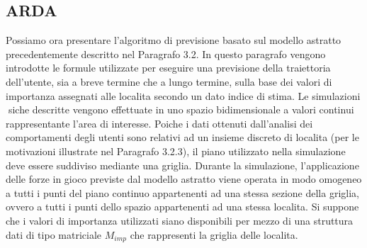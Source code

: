 \subsection{ARDA}
Possiamo ora presentare l'algoritmo di previsione basato sul modello astratto
precedentemente descritto nel Paragrafo 3.2. In questo paragrafo vengono
introdotte le formule utilizzate per eseguire una previsione della traiettoria
dell'utente, sia a breve termine che a lungo termine, sulla base dei valori di
importanza assegnati alle localita secondo un dato indice di stima.
Le simulazioni siche descritte vengono effettuate in uno spazio bidimensionale
a valori continui rappresentante l'area di interesse. Poiche i dati ottenuti
dall'analisi dei comportamenti degli utenti sono relativi ad un insieme
discreto di localita (per le motivazioni illustrate nel Paragrafo 3.2.3), il piano
utilizzato nella simulazione deve essere suddiviso mediante una griglia. Durante
la simulazione, l'applicazione delle forze in gioco previste dal modello
astratto viene operata in modo omogeneo a tutti i punti del piano continuo
appartenenti ad una stessa sezione della griglia, ovvero a tutti i punti dello
spazio appartenenti ad una stessa localita.
Si suppone che i valori di importanza utilizzati siano disponibili per mezzo
di una struttura dati di tipo matriciale $M_{imp}$ che rappresenti la griglia delle
localita.

